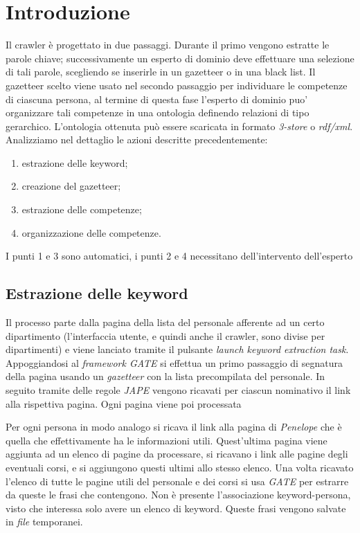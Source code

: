 \documentclass[tesi.tex]{subfiles}
\begin{document}
\section{Introduzione}
Il crawler \`e progettato in due passaggi. Durante il primo 
vengono estratte le parole chiave; successivamente un esperto di dominio deve effettuare
una selezione di tali parole, scegliendo se inserirle in un
gazetteer o in una black list. Il gazetteer scelto viene
usato nel secondo passaggio per individuare le competenze di ciascuna
persona, al termine di questa fase l'esperto di dominio puo'
organizzare tali competenze in una ontologia definendo relazioni di
tipo gerarchico. L'ontologia ottenuta pu\`o essere scaricata in
formato \emph{3-store} o \emph{rdf/xml}.
Analizziamo nel dettaglio le azioni descritte precedentemente:
\begin{enumerate}
  \item estrazione delle keyword;
  \item creazione del gazetteer;
  \item estrazione delle competenze;
  \item organizzazione delle competenze.
\end{enumerate}
I punti 1 e 3 sono automatici, i punti 2 e 4 necessitano
dell'intervento dell'esperto

\subsection{Estrazione delle keyword}\label{sez:estrazioneKeyword}
Il processo parte dalla pagina della lista del personale afferente ad
un certo dipartimento (l'interfaccia utente, e quindi anche il
crawler, sono divise per dipartimenti) e viene lanciato tramite il
pulsante \emph{launch keyword extraction task}. Appoggiandosi al
\emph{framework GATE} si effettua un primo passaggio di segnatura
della pagina usando un \emph{gazetteer} con la lista precompilata del
personale. In seguito tramite delle regole
\emph{JAPE} vengono ricavati per ciascun nominativo il link alla rispettiva
pagina. Ogni pagina viene poi processata

Per ogni persona in modo analogo si ricava il link alla pagina di
\emph{Penelope} che \`e quella che effettivamente ha le informazioni
utili. Quest'ultima pagina viene aggiunta ad un elenco di pagine da
processare, si ricavano i link alle pagine degli eventuali corsi, e si
aggiungono questi ultimi allo stesso elenco. Una volta ricavato
l'elenco di tutte le pagine utili del personale e dei corsi si usa
\emph{GATE} per estrarre da queste le frasi che contengono. Non \`e
presente l'associazione keyword-persona, visto che interessa solo 
avere un elenco di keyword. Queste frasi vengono salvate in 
\emph{file} temporanei.
\end{document}
